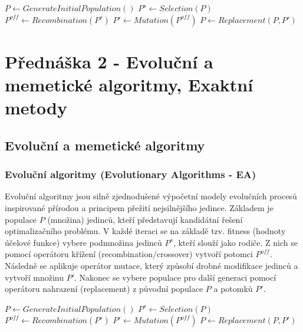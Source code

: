 \documentclass[12pt,a4paper]{article}
\theoremstyle{definition}
\begin{document}
\begin{algorithm}[H]
\caption{Evolutionary Algorithm (EA) }
\begin{algorithmic}[1]
\STATE $P \gets GenerateInitialPopulation()$ 
\STATE $P^s \gets Selection(P)$ 
\STATE $P^{off} \gets Recombination(P^s)$ 
\STATE $P' \gets Mutation(P^{off})$ 
\STATE $P \gets Replacement(P, P')$ 
\ENDWHILE
\end{algorithmic}
\end{algorithm}


\section{Přednáška 2 - Evoluční a memetické algoritmy, Exaktní metody}

\subsection{Evoluční a memetické algoritmy}

\subsubsection{Evoluční algoritmy (Evolutionary Algorithms - EA)}
Evoluční algoritmy jsou silně zjednodušené výpočetní modely evolučních procesů inspirované přírodou a principem přežití nejsilnějšího jedince. Základem je populace $P$ (množina) jedinců, kteří představují kandidátní řešení optimalizačního problému. 
V každé iteraci se na základě tzv. fitness (hodnoty účelové funkce) vybere podmnožina jedinců $P^s$, kteří slouží jako rodiče. Z nich se pomocí operátoru křížení (recombination/crossover) vytvoří potomci $P^{off}$. Následně se aplikuje operátor mutace, který způsobí drobné modifikace jedinců a vytvoří množinu $P'$. Nakonec se vybere populace pro další generaci pomocí operátoru nahrazení (replacement) z původní populace $P$ a potomků $P'$.

\begin{algorithm}[H]
\caption{Evolutionary Algorithm (EA)}
\begin{algorithmic}[1]
\STATE $P \gets GenerateInitialPopulation()$
\STATE $P^s \gets Selection(P)$
\STATE $P^{off} \gets Recombination(P^s)$
\STATE $P' \gets Mutation(P^{off})$
\STATE $P \gets Replacement(P, P')$
\ENDWHILE
\end{algorithmic}
\end{algorithm}
\end{document}
